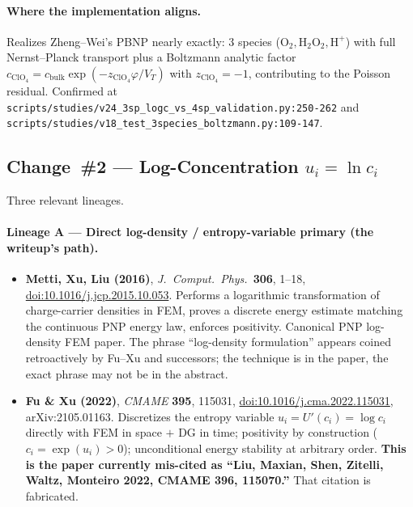 \documentclass[11pt]{article}
\newcommand{\VT}{V_{T}}
\newcommand{\Hpe}{\mathrm{H}^{+}}
\newcommand{\HtwoOtwo}{\mathrm{H}_2\mathrm{O}_2}
\begin{document}
\paragraph{Where the implementation aligns.}
Realizes Zheng--Wei's PBNP nearly exactly: 3 species
($\mathrm{O}_2,\HtwoOtwo,\Hpe$) with full Nernst--Planck transport plus a
Boltzmann analytic factor
$c_{\mathrm{ClO}_4}=c_{\mathrm{bulk}}\exp(-z_{\mathrm{ClO}_4}\varphi/\VT)$
with $z_{\mathrm{ClO}_4}=-1$, contributing to the Poisson residual. Confirmed
at \texttt{scripts/studies/v24\_3sp\_logc\_vs\_4sp\_validation.py:250-262}
and \texttt{scripts/studies/v18\_test\_3species\_boltzmann.py:109-147}.

\subsection{Change~\#2 --- Log-Concentration $u_i=\ln c_i$}

Three relevant lineages.

\paragraph{Lineage A --- Direct log-density / entropy-variable primary
(the writeup's path).}
\begin{itemize}
\item \textbf{Metti, Xu, Liu (2016)}, \emph{J.~Comput.~Phys.}\ \textbf{306},
      1--18,
      \href{https://doi.org/10.1016/j.jcp.2015.10.053}{doi:10.1016/j.jcp.2015.10.053}.
      Performs a logarithmic transformation of charge-carrier densities in FEM,
      proves a discrete energy estimate matching the continuous PNP energy
      law, enforces positivity. Canonical PNP log-density FEM paper. The phrase
      ``log-density formulation'' appears coined retroactively by Fu--Xu and
      successors; the technique is in the paper, the exact phrase may not be
      in the abstract.
\item \textbf{Fu \& Xu (2022)}, \emph{CMAME} \textbf{395}, 115031,
      \href{https://doi.org/10.1016/j.cma.2022.115031}{doi:10.1016/j.cma.2022.115031},
      arXiv:2105.01163. Discretizes the entropy variable
      $u_i=U'(c_i)=\log c_i$ directly with FEM in space $+$ DG in time;
      positivity by construction ($c_i=\exp(u_i)>0$); unconditional energy
      stability at arbitrary order. \textbf{This is the paper currently
      mis-cited as ``Liu, Maxian, Shen, Zitelli, Waltz, Monteiro 2022, CMAME
      396, 115070.''} That citation is fabricated.
\end{itemize}
\end{document}
